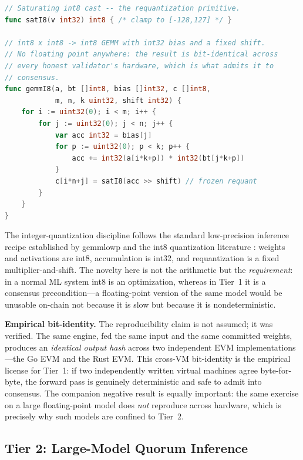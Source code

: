 \begin{lstlisting}[language=Go,caption={Tier-1 deterministic kernels: saturating int8 arithmetic and int8 GEMM with a fixed requantization shift. Pure Go, \texttt{CGO=0}; every validator computes byte-identical output (Lux \texttt{precompile/inference}, \texttt{0x0300\dots03}).},label=lst:int8]
// Saturating int8 cast -- the requantization primitive.
func satI8(v int32) int8 { /* clamp to [-128,127] */ }

// int8 x int8 -> int8 GEMM with int32 bias and a fixed shift.
// No floating point anywhere: the result is bit-identical across
// every honest validator's hardware, which is what admits it to
// consensus.
func gemmI8(a, bt []int8, bias []int32, c []int8,
            m, n, k uint32, shift int32) {
    for i := uint32(0); i < m; i++ {
        for j := uint32(0); j < n; j++ {
            var acc int32 = bias[j]
            for p := uint32(0); p < k; p++ {
                acc += int32(a[i*k+p]) * int32(bt[j*k+p])
            }
            c[i*n+j] = satI8(acc >> shift) // frozen requant
        }
    }
}
\end{lstlisting}

The integer-quantization discipline follows the standard low-precision inference recipe established by gemmlowp \cite{gemmlowp} and the int8 quantization literature \cite{jacob2018quantization}: weights and activations are int8, accumulation is int32, and requantization is a fixed multiplier-and-shift. The novelty here is not the arithmetic but the \emph{requirement}: in a normal ML system int8 is an optimization, whereas in Tier~1 it is a consensus precondition---a floating-point version of the same model would be unusable on-chain not because it is slow but because it is nondeterministic.

\textbf{Empirical bit-identity.} The reproducibility claim is not assumed; it was verified. The same engine, fed the same input and the same committed weights, produces an \emph{identical output hash} across two independent EVM implementations---the Go EVM and the Rust EVM. This cross-VM bit-identity is the empirical license for Tier~1: if two independently written virtual machines agree byte-for-byte, the forward pass is genuinely deterministic and safe to admit into consensus. The companion negative result is equally important: the same exercise on a large floating-point model does \emph{not} reproduce across hardware, which is precisely why such models are confined to Tier~2.

\subsection{Tier 2: Large-Model Quorum Inference}

